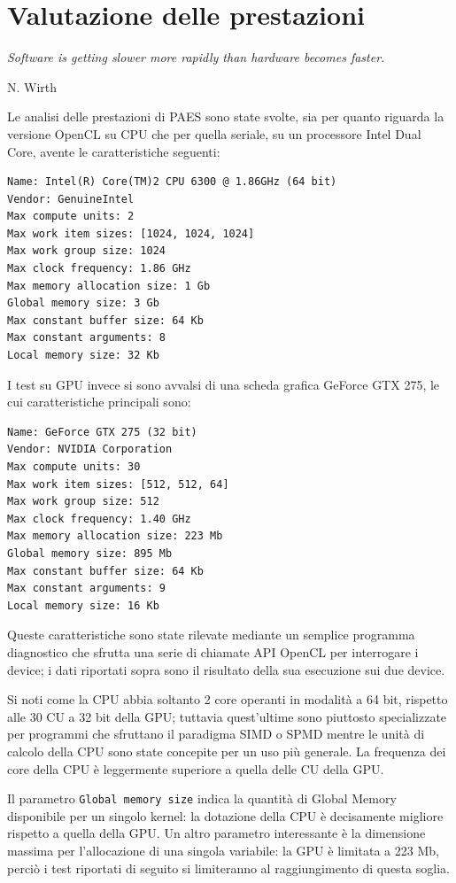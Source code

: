 \documentclass[12pt,a4paper,oneside]{book}
\begin{document}
\chapter{Valutazione delle prestazioni}
\linespread{1}
\epigraph{\textit{Software is getting slower more rapidly than hardware becomes faster.}}{N. Wirth}
\linespread{1.3}

Le analisi delle prestazioni di PAES sono state svolte, sia per quanto riguarda la versione \ac{OpenCL} su \ac{CPU} che per quella seriale, su un processore Intel Dual Core, avente le caratteristiche seguenti:
\begin{verbatim}
Name: Intel(R) Core(TM)2 CPU 6300 @ 1.86GHz (64 bit)
Vendor: GenuineIntel
Max compute units: 2
Max work item sizes: [1024, 1024, 1024]
Max work group size: 1024
Max clock frequency: 1.86 GHz
Max memory allocation size: 1 Gb
Global memory size: 3 Gb
Max constant buffer size: 64 Kb
Max constant arguments: 8
Local memory size: 32 Kb
\end{verbatim}

I test su \ac{GPU} invece si sono avvalsi di una scheda grafica GeForce GTX 275, le cui caratteristiche principali sono:
\begin{verbatim}
Name: GeForce GTX 275 (32 bit)
Vendor: NVIDIA Corporation
Max compute units: 30
Max work item sizes: [512, 512, 64]
Max work group size: 512
Max clock frequency: 1.40 GHz
Max memory allocation size: 223 Mb
Global memory size: 895 Mb
Max constant buffer size: 64 Kb
Max constant arguments: 9
Local memory size: 16 Kb
\end{verbatim}

Queste caratteristiche sono state rilevate mediante un semplice programma diagnostico che sfrutta una serie di chiamate \ac{API} \ac{OpenCL} per interrogare i device; i dati riportati sopra sono il risultato della sua esecuzione sui due device.

Si noti come la \ac{CPU} abbia soltanto 2 core operanti in modalità a 64 bit, rispetto alle 30 \ac{CU} a 32 bit della \ac{GPU}; tuttavia quest'ultime sono piuttosto specializzate per programmi che sfruttano il paradigma \ac{SIMD} o \ac{SPMD} mentre le unità di calcolo della \ac{CPU} sono state concepite per un uso più generale. La frequenza dei core della \ac{CPU} è leggermente superiore a quella delle \ac{CU} della \ac{GPU}.

Il parametro \verb|Global memory size| indica la quantità di Global Memory disponibile per un singolo kernel:  la dotazione della \ac{CPU} è decisamente migliore rispetto a quella della \ac{GPU}. Un altro parametro interessante è la dimensione massima per l'allocazione di una singola variabile: la \ac{GPU} è limitata a 223 Mb, perciò i test riportati di seguito si limiteranno al raggiungimento di questa soglia.
\end{document}

